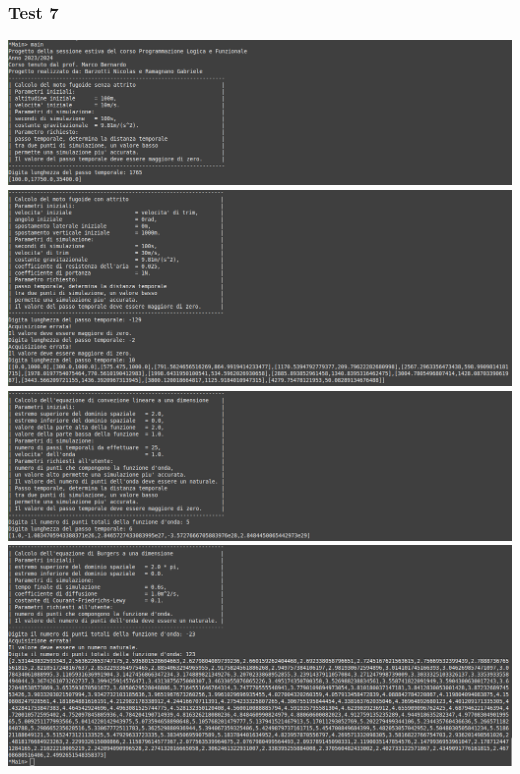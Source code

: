 \subsubsection*{Test 7}
\includegraphics[width=\textwidth,height=\textheight,keepaspectratio]{05_testing/image/hs/07_test/01_misto.png}
\\
\includegraphics[width=\textwidth,height=\textheight,keepaspectratio]{05_testing/image/hs/07_test/02_misto.png}
\\
\includegraphics[width=\textwidth,height=\textheight,keepaspectratio]{05_testing/image/hs/07_test/03_misto.png}
\\
\includegraphics[width=\textwidth,height=\textheight,keepaspectratio]{05_testing/image/hs/07_test/04_misto.png}

